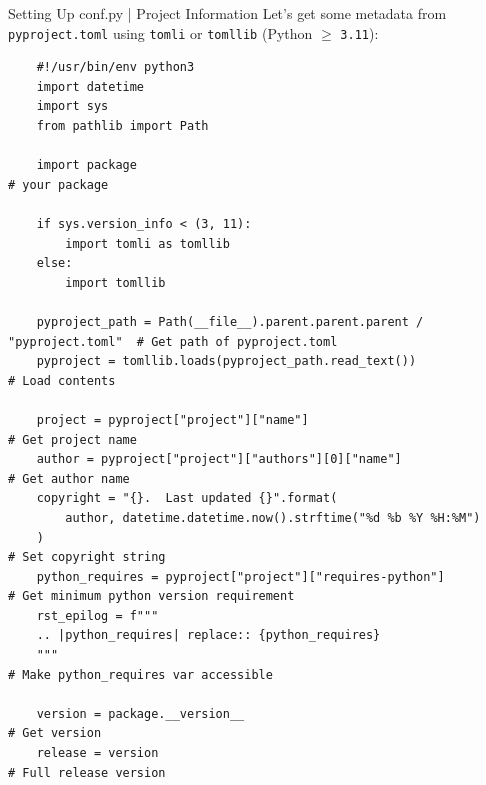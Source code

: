 \begin{darkframe}[fragile]{Setting Up conf.py | Project Information}
  \vspace*{0.25cm}
  Let's get some metadata from \texttt{pyproject.toml} using \texttt{tomli} or \texttt{tomllib} (Python $\geqslant$ \texttt{3.11}):\\[0.25\baselineskip]
  \footnotesize
  \begin{verbatim}
    #!/usr/bin/env python3
    import datetime
    import sys
    from pathlib import Path

    import package                                                           # your package

    if sys.version_info < (3, 11):
        import tomli as tomllib
    else:
        import tomllib

    pyproject_path = Path(__file__).parent.parent.parent / "pyproject.toml"  # Get path of pyproject.toml
    pyproject = tomllib.loads(pyproject_path.read_text())                    # Load contents

    project = pyproject["project"]["name"]                                   # Get project name
    author = pyproject["project"]["authors"][0]["name"]                      # Get author name
    copyright = "{}.  Last updated {}".format(
        author, datetime.datetime.now().strftime("%d %b %Y %H:%M")
    )                                                                        # Set copyright string
    python_requires = pyproject["project"]["requires-python"]                # Get minimum python version requirement
    rst_epilog = f"""
    .. |python_requires| replace:: {python_requires}
    """                                                                      # Make python_requires var accessible

    version = package.__version__                                            # Get version
    release = version                                                        # Full release version
  \end{verbatim}
\end{darkframe}


